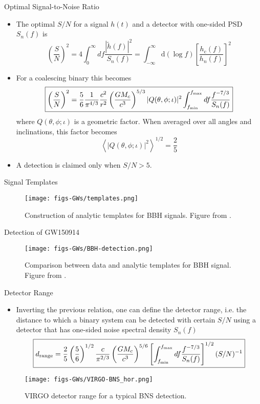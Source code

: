 \documentclass[size=11pt,style=paintings]{powerdot}
\begin{document}
  
  \begin{slide}{Optimal Signal-to-Noise Ratio}
 \begin{itemize}
 \item The optimal $S/N$ for a signal $h(t)$ and a detector with one-sided PSD $S_n(f)$ is 
 $$\boxed{\left(\frac{S}{N}\right)^{2}=4 \int_{0}^{\infty} d f \frac{|\tilde{h}(f)|^{2}}{S_{n}(f)} =\int_{-\infty}^{\infty} \mathrm{d}(\log f)\left[\frac{h_{\mathrm{c}}(f)}{h_{n}(f)}\right]^{2}}$$
\item For a coalescing binary this becomes
$$\boxed{\left(\frac{S}{N}\right)^{2}=\frac{5}{6} \frac{1}{\pi^{4 / 3}} \frac{c^{2}}{r^{2}}\left(\frac{G M_{c}}{c^{3}}\right)^{5 / 3}|Q(\theta, \phi ; \iota)|^{2} \int_{f_{\rm min}}^{f_{\max }} d f \frac{f^{-7 / 3}}{S_{n}(f)} }$$
where $Q(\theta, \phi ; \iota)$ is a geometric factor. When averaged over all angles and inclinations, this factor becomes
$$\left\langle|Q(\theta, \phi ; \iota)|^{2}\right\rangle^{1 / 2}=\frac{2}{5}$$

\item A detection is claimed only when $S/N>5$.
 \end{itemize}
 \end{slide}
 
 \begin{slide}{Signal Templates}
 
 \begin{figure}
 \centering
   \texttt{[image: figs-GWs/templates.png]}
  \caption{Construction of analytic templates for BBH signals.
Figure from \cite{2019CRPhy..20..507B}.}
\label{fig:polarization}
\end{figure}
 \end{slide}
 
 \begin{slide}{Detection of GW150914}
 \begin{figure}
 \centering
   \texttt{[image: figs-GWs/BBH-detection.png]}
  \caption{Comparison between data and analytic templates for BBH signal. Figure from \cite{2019CRPhy..20..507B}.}
\label{fig:polarization}
\end{figure}
 \end{slide}
 
  
  \begin{slide}{Detector Range}
 \begin{itemize}
 \item Inverting the previous relation, one can define the detector range, i.e. the distance to which a binary system can be detected with certain $S/N$ using a detector that has one-sided
noise spectral density $S_n(f)$ 
 \vskip -0.6cm
 $$\boxed{ d_{\rm range}=\frac{2}{5}\left(\frac{5}{6}\right)^{1 / 2} \frac{c}{\pi^{2 / 3}}\left(\frac{G M_{c}}{c^{3}}\right)^{5 / 6}\left[\int_{f_{\rm min}}^{f_{\max }} d f \frac{f^{-7 / 3}}{S_{n}(f)}\right]^{1 / 2}(S / N)^{-1}}$$
 \end{itemize}
 \vskip -0.5cm
\begin{figure}
 \centering
   \texttt{[image: figs-GWs/VIRGO-BNS\_hor.png]}
  \caption{VIRGO detector range for a typical BNS detection.}
\label{fig:polarization}
\end{figure}
 \end{slide}
 
\end{document}
